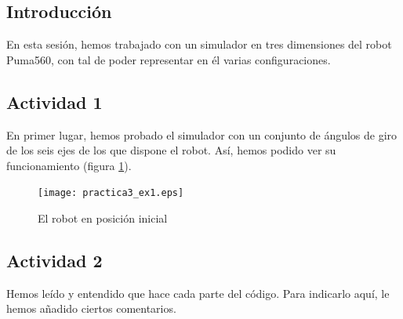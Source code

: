 \documentclass{article}
\newcommand{\fref}[1]{figura \ref{fig:#1}}
\begin{document}
\subsection{Introducción}
En esta sesión, hemos trabajado con un simulador en tres dimensiones del robot Puma560, con tal de poder representar en él varias configuraciones.

\subsection{Actividad 1}
En primer lugar, hemos probado el simulador con un conjunto de ángulos de giro de los seis ejes de los que dispone el robot. Así, hemos podido ver su funcionamiento (\fref{robotIni}).

\begin{figure}[h]
\centering
\texttt{[image: practica3\_ex1.eps]}
\caption{El robot en posición inicial}
\label{fig:robotIni}
\end{figure}

\subsection{Actividad 2}

Hemos leído y entendido que hace cada parte del código. Para indicarlo aquí, le hemos añadido ciertos comentarios.
\end{document}

